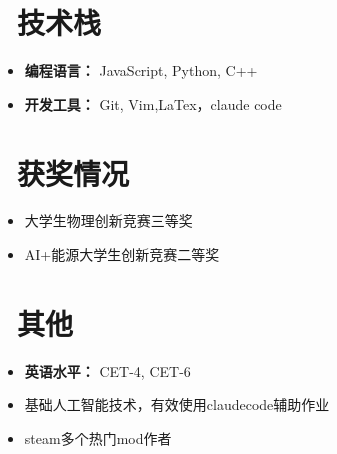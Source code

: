 \documentclass[11pt]{article}
\begin{document}
\section{\makebox[\widthof{\faCogs}][c]{\color{CVBlue}\faCogs}\ 技术栈}
\begin{itemize}[nosep]
    \item \textbf{编程语言：} JavaScript, Python, C++
    \item \textbf{开发工具：} Git, Vim,LaTex，claude code
\end{itemize}
\section{\makebox[\widthof{\faGraduationCap}][c]{\color{CVBlue}\faList}\ 获奖情况}
\begin{itemize}
    \item 大学生物理创新竞赛三等奖
    \item AI+能源大学生创新竞赛二等奖
\end{itemize}
    
\section{\makebox[\widthof{\faInfo}][c]{\color{CVBlue}\faInfo}\ 其他}
\begin{itemize}[parsep=0.5ex]
    \item \textbf{英语水平：} CET-4, CET-6
    \item 基础人工智能技术，有效使用claudecode辅助作业
    \item steam多个热门mod作者
\end{itemize}
\end{document}
